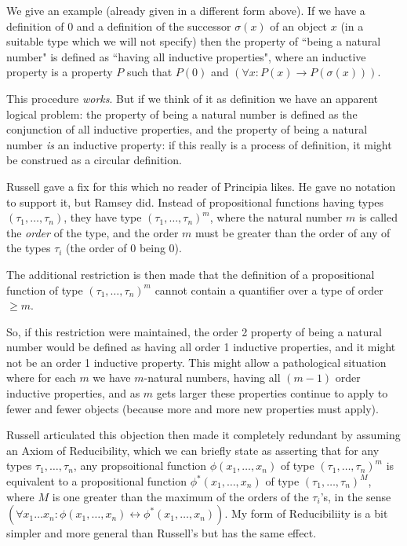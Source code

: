 \documentclass[12pt]{article}
\begin{document}
We give an example (already given in a different form above).  If we have a definition of 0 and a definition of the successor $\sigma(x)$ of an object $x$ (in a suitable type which we will not specify) then the  property of ``being a natural number" is defined as ``having all inductive properties", where an inductive property is a property $P$ such that
$P(0)$ and $(\forall x:P(x) \rightarrow P(\sigma(x)))$.

This procedure {\em works\/}.  But if we think of it as definition we have an apparent logical problem:  the property of being a natural number is defined as the conjunction of all inductive properties, and the property of being a natural number {\em is\/} an inductive property:  if this really is a process of definition, it might be construed as a circular definition.

Russell gave a fix for this which no reader of Principia likes.  He gave no notation to support it, but Ramsey did.  Instead of propositional functions having types
$(\tau_1,\ldots,\tau_n)$, they have type 
$(\tau_1,\ldots,\tau_n)^m$, where the natural number $m$ is called the {\em order\/} of the type, and the order $m$ must be greater than the order of any of the types
$\tau_i$ (the order of 0 being 0).

The additional restriction is then made that the definition of a propositional function of type $(\tau_1,\ldots,\tau_n)^m$ cannot contain a quantifier over a type of order $\geq m$.

So, if this restriction were maintained, the order 2 property of being a natural number would be defined as having all order 1 inductive properties, and it might not be an order 1 inductive property.  This might allow a pathological situation where for each $m$ we have $m$-natural numbers, having all $(m-1)$ order inductive properties, and as $m$ gets larger these properties
continue to apply to fewer and fewer objects (because more and more new properties must apply).

Russell articulated this objection then made it completely redundant by assuming an Axiom of Reducibility, which we can briefly state as asserting that for any types
$\tau_1, \ldots,\tau_n$, any propsoitional function  $\phi(x_1,\ldots,x_n)$ of type $(\tau_1, \ldots,\tau_n)^m$ is equivalent to a propositional function $\phi^*(x_1,\ldots,x_n)$
of type $(\tau_1, \ldots,\tau_n)^M$, where $M$ is one greater than the maximum of the orders of the $\tau_i$'s, in the sense $(\forall x_1\ldots x_n:\phi(x_1,\ldots,x_n) \leftrightarrow \phi^*(x_1,\ldots,x_n))$.  My form of Reducibiliity is a bit simpler and more general than Russell's but has the same effect.
\end{document}
